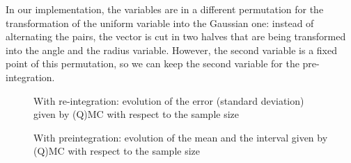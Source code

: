 \documentclass[a4paper]{article}
\theoremstyle{definition}
\theoremstyle{remark}
\begin{document}
In our implementation, the variables are in a different permutation for the transformation of the uniform variable into the Gaussian one: instead of alternating the pairs, the vector is cut in two halves that are being transformed into the angle and the radius variable. However, the second variable is a fixed point of this permutation, so we can keep the second variable for the pre-integration.
\begin{figure}[H] 
    \caption{With re-integration: evolution of the error (standard deviation) given by (Q)MC with respect to the sample size}
    \label{fig:q2error}
\end{figure}
\begin{figure}[H] 
    \caption{With preintegration: evolution of the mean and the interval given by (Q)MC with respect to the sample size}
    \label{fig:q2interval}
\end{figure}
\end{document}
